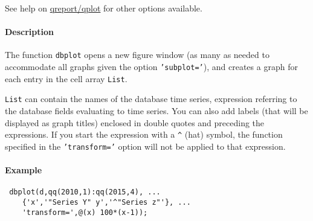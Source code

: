  See help on \url{qreport/qplot} for other options available.
 
 \paragraph{Description}
 
 The function \texttt{dbplot} opens a new figure window (as many as
 needed to accommodate all graphs given the option \texttt{'subplot='}),
 and creates a graph for each entry in the cell array \texttt{List}.
 
 \texttt{List} can contain the names of the database time series,
 expression referring to the database fields evaluating to time series.
 You can also add labels (that will be displayed as graph titles)
 enclosed in double quotes and preceding the expressions. If you start
 the expression with a \texttt{\^{}} (hat) symbol, the function specified
 in the \texttt{'transform='} option will not be applied to that
 expression.
 
 \paragraph{Example}
 
 \begin{verbatim}
 dbplot(d,qq(2010,1):qq(2015,4), ...
    {'x','"Series Y" y','^"Series z"'}, ...
    'transform=',@(x) 100*(x-1));
 \end{verbatim}


